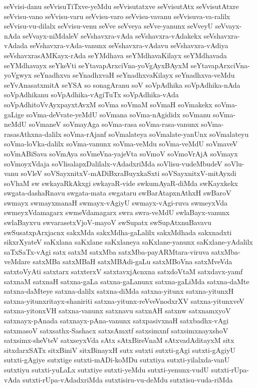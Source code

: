 {seVvisi-danu
seVvisuTiTxve-yeMdu
seVvisutatxve
seVvisutAtx
seVvisutAtxre
seVvisu-vano
seVvisu-varu
seVvisu-varo
seVvisu-vavanu
seVvisuva-va-ralilx
seVvisu-vu-dilalx
seVvisu-venu
seVve
seVveya
seVve-yanunx
seVveyU
seVvayx-nAda
seVvayx-niMdaleV
seVshavxra-vAda
seVshavxra-vAdakekx
seVshavxra-vAdada
seVshavxra-vAda-vanunx
seVshavxra-vAdavu
seVshavxra-vAdiya
seVshavxrasAMKayx-rAda
seYMdhava
seYMdhavaKilayx
seYMdhavada
seYMdhavayx
seYkeVti
seYtavapArxciVna-yoVgAyxBAyxM
seYtavapArxciVna-yoVgwyx
seYnadhxva
seYnadhxvaH
seYnadhxvaKilayx
seYnadhxva-veMdu
seYvAnasatxmitA
seYSA
so
sonagAranu
soV
soVpAdhika
soVpAdhika-nAda
soVpAdhikanu
soVpAdhika-vAgiTuTx
soVpAdhika-vAda
soVpAdhitoVvAyxpayxtAvxM
soVma
soVmaM
soVmaH
soVmakekx
soVma-gaLige
soVma-deVvate-yeMdU
soVmana
soVma-nAgididx
soVmanu
soVma-neMdU
soVmaneV
soVmayAga
soVma-rasa
soVma-rasa-vanunx
soVma-rasasAthxna-dalilx
soVma-rAjanf
soVmalateya
soVmalate-yanUnx
soVmalateyu
soVma-loVka-dalilx
soVma-vanunx
soVma-veMdu
soVma-veMdU
soVmaveV
soVmABiSava
soVmAya
soVmeVna-yajeVta
soVmoV
soVmoVrAjA
soVmayx
soVmoyxVdaja
soVlisalapxDalilalx-vAdadxriMda
soVlisu-vudeMbudeV
soVlu-vanu
soVleV
soVSayxnitxV-mADiBxraBuyxkaSxti
soVSayxnitxV-mitAyxdi
soVhaM
sw
swkayaRkAkxgi
swkayaR-vide
swkumAyaR-diMda
swKayxkekx
swgata-dashaRnavu
swgata-mata
swgataru
swBarAtapxnAthxH
swBaroV
swmayx
swmayxmanaH
swmayx-vAgiyU
swmayx-vAgi-ruva
swmeyxVda
swmeyxVdamagarx
swmeVdamagarx
swra
swra-veMdU
swlaBayx-vanunx
swlaBayxvu
swvarasetxVjoV-mayoV
swSupatx
swSupAtxnuBavavu
swSusatxpArxjacnx
sakxMda
sakxMdha-gaLalilx
sakxMdhada
sakxnadxti
sikxrXyateV
saKxlana
saKxlane
saKxlaneya
saKxlane-yanunx
saKxlane-yAdalilx
saTxSaTx-vAgi
satx
satxM
satxMba
satxMba-payARMtara-viruva
satxMba-veMdare
satxMBa
satxMBaH
satxMBAdi-gaLu
satxMBoVna
satxMveVda
satxtoVyAti
satxtarx
satxterxV
satxtavxjAcnxna
satxdoVtaM
satxdavx-yamf
satxnaM
satxnaH
satxna-gaLa
satxna-gaLanunx
satxna-gaLiMda
satxna-daMte
satxna-daMteye
satxna-dalilx
satxna-diMda
satxna-yitunx
satxna-yitunxH
satxna-yitunxritayx-shaniriti
satxna-yitunx-reVveVnodxrXV
satxna-yitunxveV
satxna-yitonxVH
satxna-vanunx
satxnavu
satxnAH
satxnw
satxnamxyoV
satxnayx-pAnada
satxnayx-pAna-vanunx
satxpasivxnaH
satxbadhx-vAgi
satxmasoV
satxsathx-Sashacx
satxsAmxtf
satxsimxnf
satxsimxnayxshoV
satxsimx-sheVteV
satxseyxVda
sAtx
sAtxBireVnaM
sAtxvadAditayxM
sitx
sitxdarxSATx
sitxBiniV
sitxBinayxH
sutx
sutxti
sutxti-gAgi
sutxti-gAgiyU
sutxti-gAgiye
sutxtige
sutxti-mADi-koMDu
sutxtiya
sutxti-yilalxda-vanU
sutxtiyu
sutxti-yuLaLx
sutxtiye
sutxti-yeMdu
sutxti-yenunx-vudU
sutxti-rUpa-vAda
sutxti-rUpa-vAdadxriMda
sutxtisiru-vu-deMdu
sutxtisu-vuda-riMda
}
